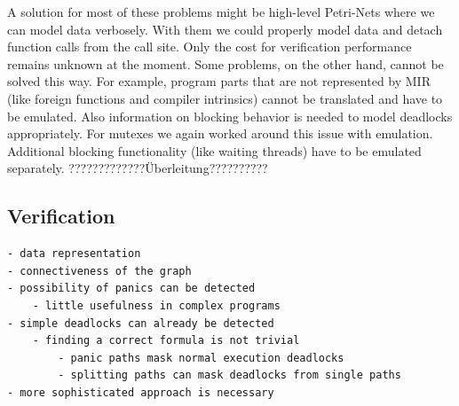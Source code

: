 A solution for most of these problems might be high-level Petri-Nets where we can model data verbosely.
With them we could properly model data and detach function calls from the call site.
Only the cost for verification performance remains unknown at the moment.
Some problems, on the other hand, cannot be solved this way.
For example, program parts that are not represented by MIR (like foreign functions and compiler intrinsics) cannot be translated and have to be emulated.
Also information on blocking behavior is needed to model deadlocks appropriately.
For mutexes we again worked around this issue with emulation.
Additional blocking functionality (like waiting threads) have to be emulated separately.
?????????????Überleitung??????????

\subsection{Verification}
\begin{verbatim}
- data representation
- connectiveness of the graph
- possibility of panics can be detected
    - little usefulness in complex programs
- simple deadlocks can already be detected
    - finding a correct formula is not trivial
        - panic paths mask normal execution deadlocks
        - splitting paths can mask deadlocks from single paths
- more sophisticated approach is necessary
\end{verbatim}
